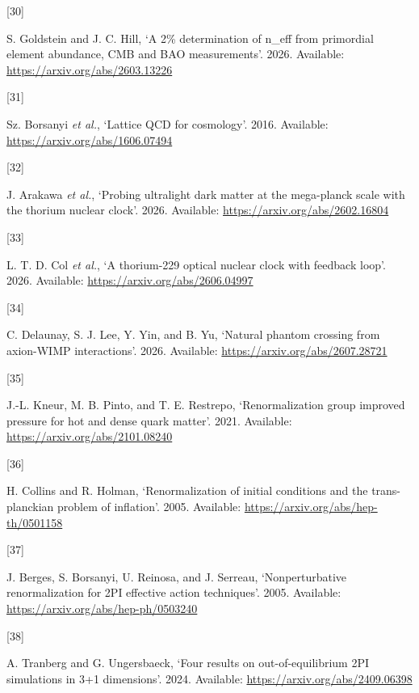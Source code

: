 \documentclass[
]{article}
\newlength{\cslhangindent}
\newlength{\csllabelwidth}
\newenvironment{CSLReferences}[2] %
 {\begin{list}{}{%
  \setlength{\itemindent}{0pt}
  \setlength{\leftmargin}{0pt}
  \setlength{\parsep}{0pt}
  \ifodd #1
   \setlength{\leftmargin}{\cslhangindent}
   \setlength{\itemindent}{-1\cslhangindent}
  \fi
  \setlength{\itemsep}{#2\baselineskip}}}
 {\end{list}}
\newcommand{\CSLLeftMargin}[1]{\parbox[t]{\csllabelwidth}{\strut#1\strut}}
\newcommand{\CSLRightInline}[1]{\parbox[t]{\linewidth - \csllabelwidth}{\strut#1\strut}}
\begin{document}
\begin{CSLReferences}{0}{0}
\CSLLeftMargin{{[}30{]} }%
\CSLRightInline{S. Goldstein and J. C. Hill, {`A 2\% determination of
n\_eff from primordial element abundance, CMB and BAO measurements'}.
2026. Available: \url{https://arxiv.org/abs/2603.13226}}

\CSLLeftMargin{{[}31{]} }%
\CSLRightInline{Sz. Borsanyi \emph{et al.}, {`Lattice QCD for
cosmology'}. 2016. Available: \url{https://arxiv.org/abs/1606.07494}}

\CSLLeftMargin{{[}32{]} }%
\CSLRightInline{J. Arakawa \emph{et al.}, {`Probing ultralight dark
matter at the mega-planck scale with the thorium nuclear clock'}. 2026.
Available: \url{https://arxiv.org/abs/2602.16804}}

\CSLLeftMargin{{[}33{]} }%
\CSLRightInline{L. T. D. Col \emph{et al.}, {`A thorium-229 optical
nuclear clock with feedback loop'}. 2026. Available:
\url{https://arxiv.org/abs/2606.04997}}

\CSLLeftMargin{{[}34{]} }%
\CSLRightInline{C. Delaunay, S. J. Lee, Y. Yin, and B. Yu, {`Natural
phantom crossing from axion-WIMP interactions'}. 2026. Available:
\url{https://arxiv.org/abs/2607.28721}}

\CSLLeftMargin{{[}35{]} }%
\CSLRightInline{J.-L. Kneur, M. B. Pinto, and T. E. Restrepo,
{`Renormalization group improved pressure for hot and dense quark
matter'}. 2021. Available: \url{https://arxiv.org/abs/2101.08240}}

\CSLLeftMargin{{[}36{]} }%
\CSLRightInline{H. Collins and R. Holman, {`Renormalization of initial
conditions and the trans-planckian problem of inflation'}. 2005.
Available: \url{https://arxiv.org/abs/hep-th/0501158}}

\CSLLeftMargin{{[}37{]} }%
\CSLRightInline{J. Berges, S. Borsanyi, U. Reinosa, and J. Serreau,
{`Nonperturbative renormalization for 2PI effective action techniques'}.
2005. Available: \url{https://arxiv.org/abs/hep-ph/0503240}}

\CSLLeftMargin{{[}38{]} }%
\CSLRightInline{A. Tranberg and G. Ungersbaeck, {`Four results on
out-of-equilibrium 2PI simulations in 3+1 dimensions'}. 2024. Available:
\url{https://arxiv.org/abs/2409.06398}}


\end{CSLReferences}
\end{document}
